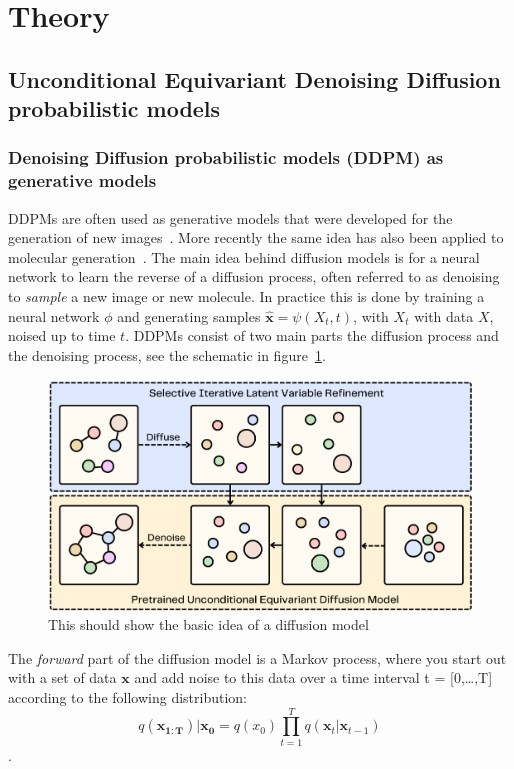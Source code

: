 \documentclass[journal=jacsat,manuscript=article]{achemso}
\begin{document}
\section{Theory}
\subsection{Unconditional Equivariant Denoising Diffusion probabilistic models}
\subsubsection*{Denoising Diffusion probabilistic models (DDPM) as generative models}
DDPMs are often used as generative models that were developed for the generation of new images~\cite{}. More recently the same idea has also been applied to molecular generation~\cite{}. The main idea behind diffusion models is for a neural network to learn the reverse of a diffusion process, often referred to as denoising to \textit{sample} a new image or new molecule. In practice this is done by training a neural network $\phi$ and generating samples $\hat{\mathbf{x}}=\psi(X_t,t)$, with $X_t$ with data $X$, noised up to time $t$.  DDPMs consist of two main parts the diffusion process and the denoising process, see the schematic in figure~\ref{fig:diffusion_schematic}.
\begin{figure}
    \centering
    \includegraphics[width=\textwidth]{Figures/model_no_stickman.png}
    \caption{This should show the basic idea of a diffusion model}
    \label{fig:diffusion_schematic}
\end{figure}
The \textit{forward} part of the diffusion model is a Markov process, where you start out with a set of data $\mathbf{x}$ and add noise to this data over a time interval t = [0,\ldots,T] according to the following distribution:
\begin{equation}
  q(\mathbf{x_{1:T}})|\mathbf{x_0} = q(x_0)\prod_{t=1}^T q(\mathbf{x}_t|\mathbf{x}_{t-1})
\end{equation}.
\end{document}
